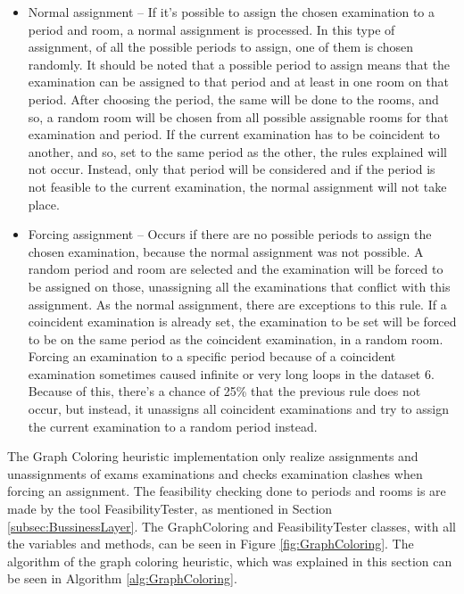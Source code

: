 \begin{itemize}
	\item Normal assignment -- If it's possible to assign the chosen examination to a period and room, a normal assignment is processed. In this type of assignment, of all the possible periods to assign, one of them is chosen randomly. It should be noted that a possible period to assign means that the examination can be assigned to that period and at least in one room on that period. After choosing the period, the same will be done to the rooms, and so, a random room will be chosen from all possible assignable rooms for that examination and period. If the current examination has to be coincident to another, and so, set to the same period as the other, the rules explained will not occur. Instead, only that period will be considered and if the period is not feasible to the current examination, the normal assignment will not take place. \\
	\item Forcing assignment -- Occurs if there are no possible periods to assign the chosen examination, because the normal assignment was not possible. A random period and room are selected and the examination will be forced to be assigned on those, unassigning all the examinations that conflict with this assignment. As the normal assignment, there are exceptions to this rule. If a coincident examination is already set, the examination to be set will be forced to be on the same period as the coincident examination, in a random room. Forcing an examination to a specific period because of a coincident examination sometimes caused infinite or very long loops in the dataset 6. Because of this, there's a chance of 25\% that the previous rule does not occur, but instead, it unassigns all coincident examinations and try to assign the current examination to a random period instead.
\end{itemize}
The Graph Coloring heuristic implementation only realize assignments and unassignments of exams examinations and checks examination clashes when forcing an assignment. The feasibility checking done to periods and rooms is are made by the tool FeasibilityTester, as mentioned in Section \ref{subsec:BussinessLayer}. The GraphColoring and FeasibilityTester classes, with all the variables and methods, can be seen in Figure \ref{fig:GraphColoring}. The algorithm of the graph coloring heuristic, which was explained in this section can be seen in Algorithm \ref{alg:GraphColoring}.\\

